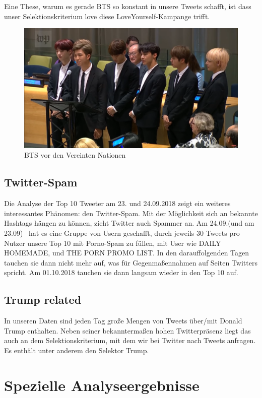 Eine These, warum es gerade BTS so konstant in unsere Tweets schafft,
ist dass unser Selektionskriterium love diese LoveYourself-Kampange
trifft.

\begin{figure}
\centering
\includegraphics[width=\textwidth]{bilder/eigene20PrC3A4sentation-img4.png}
\caption{BTS vor den Vereinten Nationen}
\end{figure}

\bigskip

\subsection{Twitter-Spam}
Die Analyse der Top 10 Tweeter am 23. und 24.09.2018 zeigt ein weiteres
interessantes Phänomen: den Twitter-Spam. Mit der Möglichkeit sich an
bekannte Hashtags hängen zu können, zieht Twitter auch Spammer an. Am
24.09.(und am 23.09) \ hat es eine Gruppe von Usern geschafft, durch
jeweils 30 Tweets pro Nutzer unsere Top 10 mit Porno-Spam zu füllen,
mit User wie DAILY HOMEMADE, und THE PORN PROMO LIST. In den
darauffolgenden Tagen tauchen sie dann nicht mehr auf, was für
Gegenmaßennahmen auf Seiten Twitters spricht. Am 01.10.2018 tauchen sie
dann langsam wieder in den Top 10 auf.

\subsection{Trump related}
In unseren Daten sind jeden Tag große Mengen von Tweets über/mit Donald
Trump enthalten. Neben seiner bekanntermaßen hohen Twitterpräsenz liegt
das auch an dem Selektionskriterium, mit dem wir bei Twitter nach
Tweets anfragen. Es enthält unter anderem den Selektor Trump.

\section{Spezielle
Analyseergebnisse}
